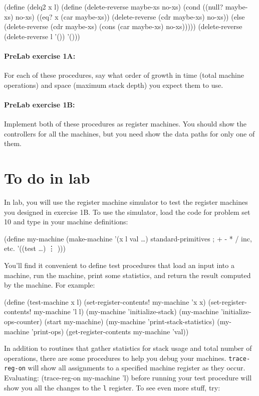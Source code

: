 \medskip
\beginlisp
(define (delq2 x l)
  (define (delete-reverse maybe-xs no-xs)
    (cond ((null? maybe-xs) no-xs)
          ((eq? x (car maybe-xs)) (delete-reverse (cdr maybe-xs) no-xs))
          (else (delete-reverse (cdr maybe-xs) (cons (car maybe-xs) no-xs)))))
  (delete-reverse (delete-reverse l '()) '()))
\endlisp

\paragraph{PreLab exercise 1A:}
For each of these procedures, say what order of growth in time (total
machine operations) and space (maximum stack depth) you expect them to use.

\paragraph{PreLab exercise 1B:}
Implement both of these procedures as register machines.  You should show
the controllers for all the machines, but you need show the data paths for
only one of them.

\section{To do in lab}

In lab, you will use the register machine simulator to test the register
machines you designed in exercise 1B.  To use the simulator, load the code
for problem set 10 and type in your machine definitions:

\beginlisp
(define my-machine
  (make-machine
   '(x l val \ldots)
   standard-primitives          ; + - * / inc, etc.
   '((test \ldots)
     \vdots
     )))
\endlisp

You'll find it convenient to define test procedures that load an input
into a machine, run the machine, print some statistics, and return the
result computed by the machine.  For example:

\beginlisp
(define (test-machine x l)
  (set-register-contents! my-machine 'x x)
  (set-register-contents! my-machine 'l l)
  (my-machine 'initialize-stack)
  (my-machine 'initialize-ops-counter)
  (start my-machine)
  (my-machine 'print-stack-statistics)
  (my-machine 'print-ops)
  (get-register-contents my-machine 'val))
\endlisp

In addition to routines that gather statistics for stack usage and
total number of operations, there are some procedures to help you
debug your machines.  {\tt trace-reg-on} will show all
assignments to a specified machine register as they occur. Evaluating:
\beginlisp
(trace-reg-on my-machine 'l)
\endlisp
before running your test procedure will show you all the changes to the
{\tt l} register. To see even more stuff, try:

